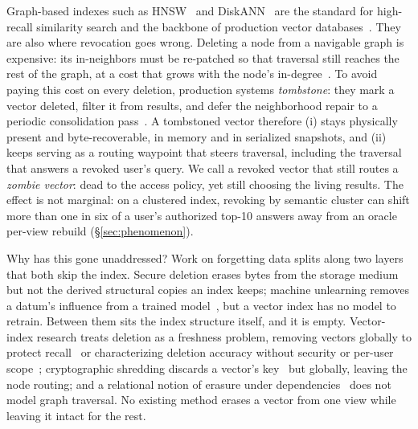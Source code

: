 \documentclass[sigconf, nonacm, review]{acmart}
\begin{document}
Graph-based indexes such as HNSW~\cite{DBLP:journals/pami/MalkovY20} and
DiskANN~\cite{DBLP:conf/nips/SubramanyaDSKK19} are the standard for
high-recall similarity search and the backbone of production vector
databases~\cite{DBLP:conf/sigmod/WangYGJXLWGLXYY21,DBLP:journals/pvldb/GuoLXYYLCXLLCQW22}.
They are also where revocation goes wrong. Deleting a node from a
navigable graph is expensive: its in-neighbors must be re-patched so that
traversal still reaches the rest of the graph, at a cost that grows with
the node's in-degree~\cite{DBLP:journals/corr/abs-2105-09613}. To avoid
paying this cost on every deletion, production systems \emph{tombstone}:
they mark a vector deleted, filter it from results, and defer the
neighborhood repair to a periodic consolidation
pass~\cite{DBLP:journals/corr/abs-2105-09613}.
A tombstoned vector therefore (i) stays physically present and
byte-recoverable, in memory and in serialized snapshots, and (ii) keeps
serving as a routing waypoint that steers traversal, including the
traversal that answers a revoked user's query. We call a revoked vector
that still routes a \emph{zombie vector}: dead to the access policy, yet
still choosing the living results. The effect is not marginal: on a clustered index, revoking by semantic cluster can shift more than one in six of a user's authorized top-10 answers away from an oracle per-view rebuild (\S\ref{sec:phenomenon}).

Why has this gone unaddressed? Work on forgetting data splits along two
layers that both skip the index. Secure deletion erases bytes from the
storage medium~\cite{DBLP:conf/sp/ReardonBC13} but not the derived
structural copies an index keeps; machine unlearning removes a datum's
influence from a trained
model~\cite{DBLP:conf/sp/BourtouleCCJTZL21,DBLP:conf/sp/CaoY15,DBLP:conf/nips/GinartGVZ19},
but a vector index has no model to retrain. Between them sits the index
structure itself, and it is empty. Vector-index research treats deletion as
a freshness problem, removing vectors globally to protect
recall~\cite{DBLP:conf/sosp/XuLLXCZLYYYCY23,DBLP:journals/corr/abs-2502-13826,DBLP:journals/corr/abs-2411-00970,DBLP:journals/corr/abs-2407-07871,DBLP:journals/corr/abs-2206-10839,DBLP:journals/pvldb/YuLGXLZSZLY25}
or characterizing deletion accuracy without security or per-user
scope~\cite{DBLP:journals/corr/abs-2512-06200}; cryptographic shredding
discards a vector's key~\cite{DBLP:journals/corr/abs-2601-07004} but
globally, leaving the node routing; and a relational notion of erasure under
dependencies~\cite{DBLP:journals/pvldb/ChakrabortyKMNNPSV25} does not model
graph traversal. No existing method erases a vector from one view while
leaving it intact for the rest.
\end{document}
